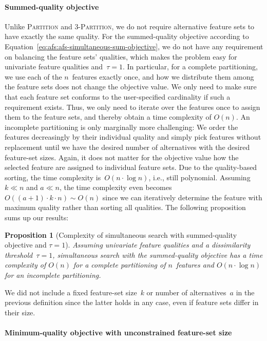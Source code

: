 \documentclass{article}
\newtheorem{proposition}{Proposition} %
\theoremstyle{definition}
\begin{document}
\paragraph{Summed-quality objective}

Unlike \textsc{Partition} and \textsc{3-Partition}, we do not require alternative feature sets to have exactly the same quality.
For the summed-quality objective according to Equation~\ref{eq:afs:afs-simultaneous-sum-objective}, we do not have any requirement on balancing the feature sets' qualities, which makes the problem easy for univariate feature qualities and~$\tau = 1$.
In particular, for a complete partitioning, we use each of the $n$~features exactly once, and how we distribute them among the feature sets does not change the objective value.
We only need to make sure that each feature set conforms to the user-specified cardinality if such a requirement exists.
Thus, we only need to iterate over the features once to assign them to the feature sets, and thereby obtain a time complexity of $O(n)$.
An incomplete partitioning is only marginally more challenging:
We order the features decreasingly by their individual quality and simply pick features without replacement until we have the desired number of alternatives with the desired feature-set sizes.
Again, it does not matter for the objective value how the selected feature are assigned to individual feature sets.
Due to the quality-based sorting, the time complexity is~$O(n \cdot \log n)$, i.e., still polynomial.
Assuming $k \ll n$ and $a \ll n$, the time complexity even becomes~$O((a+1) \cdot k \cdot n) \sim O(n)$ since we can iteratively determine the feature with maximum quality rather than sorting all qualities.
The following proposition sums up our results:
%
\begin{proposition}[Complexity of simultaneous search with summed-quality objective and $\tau=1$]
	Assuming univariate feature qualities and a dissimilarity threshold~$\tau = 1$, simultaneous search with the summed-quality objective has a time complexity of $O(n)$ for a complete partitioning of $n$~features and $O(n \cdot \log n)$ for an incomplete partitioning.
	\label{prop:afs:complexity-partitioning-sum}
\end{proposition}
%
We did not include a fixed feature-set size~$k$ or number of alternatives~$a$ in the previous definition since the latter holds in any case, even if feature sets differ in their size.

\paragraph{Minimum-quality objective with unconstrained feature-set size}
\end{document}
